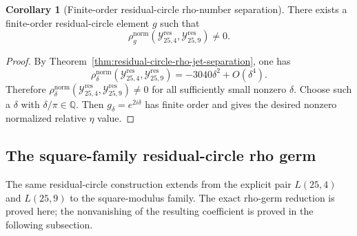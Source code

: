 \documentclass{article}
\theoremstyle{definition}
\newtheorem{corollary}[theorem]{Corollary}
\numberwithin{equation}{section}
\begin{document}
\begin{corollary}[Finite-order residual-circle rho-number separation]
\label{cor:finite-order-residual-circle-rho}
There exists a finite-order residual-circle element $g$ such that
\begin{equation}
\rho^{\text{norm}}_g(\mathcal Y^{\operatorname{res}}_{25,4},\mathcal Y^{\operatorname{res}}_{25,9})\neq 0.
\end{equation}
\end{corollary}

\begin{proof}
By Theorem~\ref{thm:residual-circle-rho-jet-separation}, one has
\begin{equation}
\rho^{\text{norm}}_\delta(\mathcal Y^{\operatorname{res}}_{25,4},\mathcal Y^{\operatorname{res}}_{25,9})=-3040\delta^2+O(\delta^4).
\end{equation}
Therefore $\rho^{\text{norm}}_\delta(\mathcal Y^{\operatorname{res}}_{25,4},\mathcal Y^{\operatorname{res}}_{25,9})\neq 0$ for all sufficiently small nonzero $\delta$.  Choose such a $\delta$ with $\delta/\pi\in\mathbb Q$.  Then $g_\delta=e^{2i\delta}$ has finite order and gives the desired nonzero normalized relative $\eta$ value.
\end{proof}

\subsection{The square-family residual-circle rho germ}
\label{subsec:stage5B2-square-family-rho-germ}

The same residual-circle construction extends from the explicit pair $L(25,4)$ and $L(25,9)$ to the square-modulus family.  The exact rho-germ reduction is proved here; the nonvanishing of the resulting coefficient is proved in the following subsection.
\end{document}
